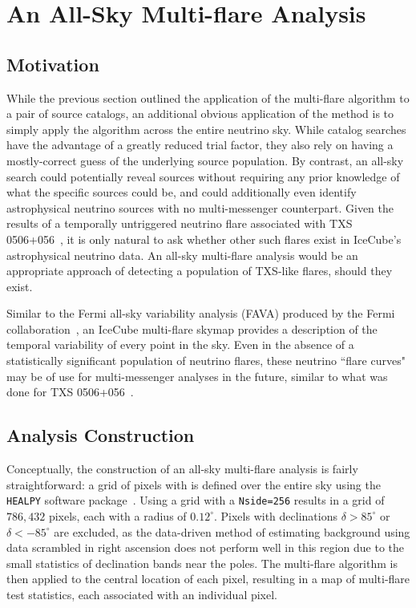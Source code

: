 \chapter{An All-Sky Multi-flare Analysis}\label{chapter:multiflareskymap}

\section{Motivation}
While the previous section outlined the application of the multi-flare algorithm to a pair of source catalogs, an additional obvious application of the method is to simply apply the algorithm across the entire neutrino sky. While catalog searches have the advantage of a greatly reduced trial factor, they also rely on having a mostly-correct guess of the underlying source population. By contrast, an all-sky search could potentially reveal sources without requiring any prior knowledge of what the specific sources could be, and could additionally even identify astrophysical neutrino sources with no multi-messenger counterpart. Given the results of a temporally untriggered neutrino flare associated with TXS 0506+056~\cite{TXS_Archival}, it is only natural to ask whether other such flares exist in IceCube's astrophysical neutrino data. An all-sky multi-flare analysis would be an appropriate approach of detecting a population of TXS-like flares, should they exist. 

Similar to the Fermi all-sky variability analysis (FAVA) produced by the Fermi collaboration~\cite{fava_paper}, an IceCube multi-flare skymap provides a description of the temporal variability of every point in the sky. Even in the absence of a statistically significant population of neutrino flares, these neutrino ``flare curves" may be of use for multi-messenger analyses in the future, similar to what was done for TXS 0506+056~\cite{TXS_Archival}\cite{TXS_Multimessenger}.

\section{Analysis Construction}
Conceptually, the construction of an all-sky multi-flare analysis is fairly straightforward: a grid of pixels with  is defined over the entire sky using the \texttt{HEALPY} software package~\cite{healpy2019}. Using a  grid with a \texttt{Nside=256} results in a grid of $786,432$ pixels, each with a radius of $0.12^{\circ}$. Pixels with declinations $\delta>85^{\circ}$ or $\delta<-85^{\circ}$ are excluded, as the data-driven method of estimating background using data scrambled in right ascension does not perform well in this region due to the small statistics of declination bands near the poles. The multi-flare algorithm is then applied to the central location of each pixel, resulting in a map of multi-flare test statistics, each associated with an individual pixel. 

